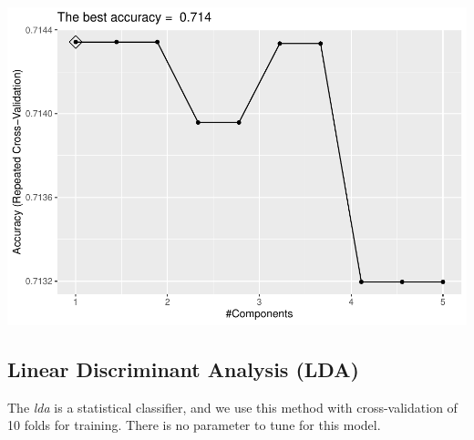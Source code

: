 \documentclass[]{article}
\newenvironment{Shaded}{\begin{snugshade}}{\end{snugshade}}
\newcommand{\CommentTok}[1]{\textcolor[rgb]{0.56,0.35,0.01}{\textit{#1}}}
\newcommand{\DataTypeTok}[1]{\textcolor[rgb]{0.13,0.29,0.53}{#1}}
\newcommand{\KeywordTok}[1]{\textcolor[rgb]{0.13,0.29,0.53}{\textbf{#1}}}
\newcommand{\NormalTok}[1]{#1}
\newcommand{\OperatorTok}[1]{\textcolor[rgb]{0.81,0.36,0.00}{\textbf{#1}}}
\newcommand{\StringTok}[1]{\textcolor[rgb]{0.31,0.60,0.02}{#1}}
\begin{document}
\includegraphics{LiverDisease_files/figure-latex/unnamed-chunk-28-1.pdf}

\begin{Shaded}
\end{Shaded}

\subsection{Linear Discriminant Analysis (LDA)}

The \emph{lda} is a statistical classifier, and we use this method with
cross-validation of 10 folds for training. There is no parameter to tune
for this model.
\end{document}

